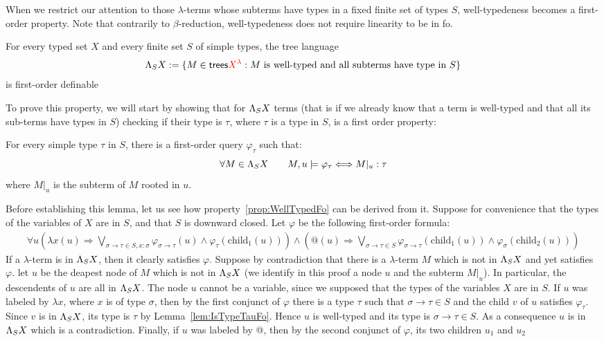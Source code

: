 When we restrict our attention to those $\lambda$-terms whose subterms have types in a fixed finite set of types $S$, well-typedeness becomes a first-order property. Note that contrarily to $\beta$-reduction, well-typedeness does not require linearity to be in fo.

\begin{proposition}\label{prop:WellTypedFo}
    For every typed set $X$ and every finite set $S$ of simple types, the tree language 
    \begin{align*}
    \Lambda_{S} X  := \{ M \in \mathsf {trees} {\color{red}{X^\lambda}} : \text{$M$ is well-typed and all subterms have type in $S$}\}
    \end{align*}
    is first-order definable 
\end{proposition}

To prove this property, we will start by showing that for $\Lambda_{S} X$ terms (that is if we already know that a term is well-typed and that all its sub-terms have types in $S$) checking if their type is $\tau$, where $\tau$ is a type in $S$, is a first order property:
\begin{lemma}\label{lem:IsTypeTauFo}
For every simple type $\tau$ in $S$, there is a first-order query $\varphi_\tau$ such that:
$$ \forall M\in \Lambda_{S} X \qquad M,u \models \varphi_\tau \Longleftrightarrow M|_u:\tau$$
where $M|_u$ is the subterm of $M$ rooted in $u$. 
\end{lemma}
Before establishing this lemma, let us see how property~\ref{prop:WellTypedFo} can be derived from it. Suppose for convenience that the types of the variables of $X$  are in $S$, and that $S$ is downward closed. Let $\varphi$ be the following first-order formula:
\begin{align*}
\forall u \left(\lambda x(u) \Rightarrow \bigvee_{\sigma\rightarrow\tau\in S, x:\sigma}
 \varphi_{\sigma\rightarrow\tau}(u)\wedge\varphi_\tau(\mathrm{child}_1(u))\right) \wedge 
\left(\text{@}(u) \Rightarrow \bigvee_{\sigma\rightarrow\tau\in S} \varphi_{\sigma\rightarrow\tau}(\mathrm{child}_1(u))\wedge\varphi_\sigma(\mathrm{child}_2(u))\right)
\end{align*}
If a $\lambda$-term is in $\Lambda_{S} X$, then it clearly satisfies $\varphi$. Suppose by contradiction that there is a $\lambda$-term $M$ which is not in $\Lambda_{S} X$ and yet satisfies $\varphi$. let $u$  be the deapest node of $M$ which is not in $\Lambda_{S} X$ (we identify in this proof a node $u$ and the subterm $M|_u$). In particular, the descendents of $u$ are all in $\Lambda_{S} X$. The node $u$ cannot be a variable, since we supposed that the types of the variables $X$ are in $S$. If $u$ was labeled by $\lambda x$, where $x$ is of type $\sigma$, then by the first conjunct of $\varphi$ there is a type $\tau$ such that $\sigma\rightarrow\tau\in S$ and the child $v$ of $u$  satisfies $\varphi_\tau$. Since $v$ is in $\Lambda_{S} X$, its type is $\tau$ by Lemma~\ref{lem:IsTypeTauFo}. Hence $u$ is well-typed and its type is $\sigma\rightarrow\tau\in S$. As a consequence $u$ is in $\Lambda_{S} X$ which is a contradiction.  Finally, if $u$ was labeled by @, then by the second conjunct of $\varphi$, its two children $u_1$ and $u_2$
